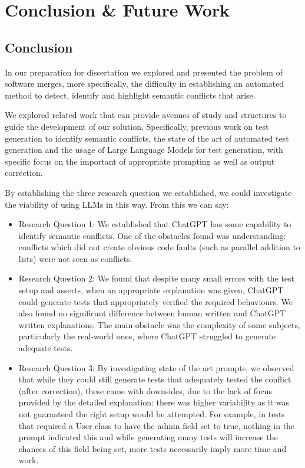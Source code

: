 \chapter{Conclusion \& Future Work}\label{chap:conclusion}

\section{Conclusion}

In our preparation for dissertation we explored and presented the problem of software merges, more specifically, the difficulty in establishing an automated method to detect, identify and highlight semantic conflicts that arise.

We explored related work that can provide avenues of study and structures to guide the development of our solution. Specifically, previous work on test generation to identify semantic conflicts, the state of the art of automated test generation and the usage of Large Language Models for test generation, with specific focus on the important of appropriate prompting as well as output correction.

By establishing the three research question we established, we could investigate the viability of using LLMs in this way. From this we can say:

\begin{itemize}
\item Research Question 1: We established that ChatGPT has some capability to identify semantic conflicts. One of the obstacles found was understanding:
conflicts which did not create obvious code faults (such as parallel addition to lists) were not seen as conflicts. 

\item Research Question 2: We found that despite many small errors with the test setup and asserts, when an appropriate explanation was given, ChatGPT could generate
tests that appropriately verified the required behaviours. We also found no significant difference between human written and ChatGPT written explanations. The main obstacle
was the complexity of some subjects, particularly the real-world ones, where ChatGPT struggled to generate adequate tests.

\item Research Question 3: By investigating state of the art prompts, we observed that while they could still generate tests that adequately tested the conflict (after correction),
these came with downsides, due to the lack of focus provided by the detailed explanation: there was higher variability as it was not guaranteed the right setup would be attempted.
For example, in tests that required a User class to have the admin field set to true, nothing in the prompt indicated this and while generating many tests will increase the chances
of this field being set, more tests necessarily imply more time and work.
\end{itemize}

